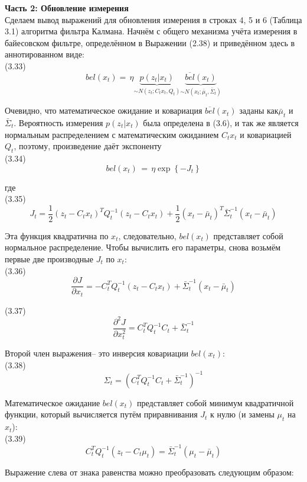 \documentclass[10pt,a4paper]{article}
\begin{document}
\textbf{Часть 2: Обновление измерения}\\

Сделаем вывод выражений для обновления измерения в строках 4, 5 и 6 (Таблица 3.1) алгоритма фильтра Калмана. Начнём с общего механизма учёта измерения в байесовском фильтре, определённом в Выражении (2.38) и приведённом здесь в аннотированном виде:\\

(3.33)
$$bel(x_t)=\,\eta\underbrace{p(z_t|x_t)}_{\sim N(z_t;C_t x_t,Q_t)}\underbrace{\overline{bel}(x_t)}_{\sim N(x_t;\bar{\mu}_t,\bar{\varSigma}_t)}$$

Очевидно, что математическое ожидание и ковариация $\overline{bel}(x_t)$ заданы как$\bar{\mu}_t$ и $\bar{\varSigma}_t$. Вероятность измерения $p(z_t | x_t)$ была определена в (3.6), и так же является нормальным распределением с математическим ожиданием $C_t x_t$ и ковариацией $Q_t$, поэтому, произведение даёт экспоненту\\

(3.34)
$$bel(x_t)\,=\,\eta\exp\left\lbrace -J_t\right\rbrace$$

где\\

(3.35)
$$J_t=\frac{1}{2}(z_t-C_t x_t)^T Q_t^{-1}(z_t-C_t x_t)+\frac{1}{2}(x_t-\bar{\mu}_t)^T\bar{\varSigma}_t^{-1}(x_t-\bar{\mu}_t)$$

Эта функция квадратична по $x_t$, следовательно, $bel(x_t)$ представляет собой нормальное распределение. Чтобы вычислить его параметры, снова возьмём первые две производные $J_t$ по $x_t$:\\

(3.36)
$$\frac{\partial J}{\partial x_t}=-C_t^T Q_t^{-1}(z_t-C_t x_t)+\bar{\varSigma}_t^{-1}(x_t-\bar{\mu}_t)$$

(3.37)
$$\frac{\partial^2J}{\partial x_t^2}=C_t^T Q_t^{-1}C_t+\bar{\varSigma}_t^{-1}$$

Второй член выражения– это инверсия ковариации $bel(x_t)$:\\

(3.38)
$$\varSigma_t=(C_t^T Q_t^{-1}C_t+\bar{\varSigma}_t^{-1})^{-1}$$

Математическое ожидание $bel(x_t)$ представляет собой минимум квадратичной функции, который вычисляется путём приравнивания $J_t$ к нулю (и замены $\mu_t$ на $x_t$):\\

(3.39)
$$C_t^T Q_t^{-1}(z_t-C_t\mu_t)=\bar{\varSigma}_t^{-1}(\mu_t-\bar{\mu}_t)$$

Выражение слева от знака равенства можно преобразовать следующим образом:\\
\end{document}

